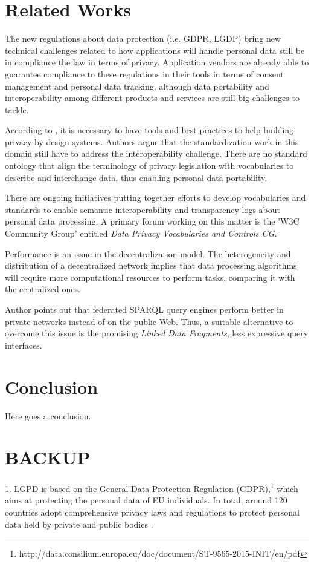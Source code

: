 \documentclass[sigconf]{acmart}
\begin{document}
\section{Related Works}

The new regulations about data protection (i.e. GDPR, LGDP) bring new technical challenges related to how applications will handle personal data still be in compliance the law in terms of privacy. Application vendors are already able to guarantee compliance to these regulations in their tools in terms of consent management and personal data tracking, although data portability and interoperability among different products and services are still big challenges to tackle.

According to \cite{bonatti2018data}, it is necessary to have tools and best practices to help building privacy-by-design systems\cite{cavoukian2009privacy}. Authors argue that the standardization work in this domain still have to address the interoperability challenge. There are no standard ontology that align the terminology of privacy legislation with vocabularies to describe and interchange data, thus enabling personal data portability.

There are ongoing initiatives putting together efforts to develop vocabularies and standards to enable semantic interoperability and transparency logs about personal data processing. A primary forum working on this matter is the 'W3C Community Group' entitled \textit{Data Privacy Vocabularies and Controls CG}.

Performance is an issue in the decentralization model\cite{verborgh_iswc_2018}. The heterogeneity and distribution of a decentralized network implies that data processing algorithms will require more computational resources to perform tasks, comparing it with the centralized ones.

Author points out that federated SPARQL query engines perform better in private networks instead of on the public Web. Thus, a suitable alternative to overcome this issue is the promising \linebreak \textit{Linked Data Fragments}\cite{LDF}, less expressive query interfaces.

\section{Conclusion}
Here goes a conclusion.


\section{BACKUP}
1.%
LGPD is based on the General Data Protection Regulation (GDPR),\footnote{http://data.consilium.europa.eu/doc/document/ST-9565-2015-INIT/en/pdf} which aims at protecting the personal data of EU individuals. In total, around 120 countries adopt comprehensive privacy laws and regulations to protect personal data held by private and public bodies \cite{Banisar2011}.
\end{document}
